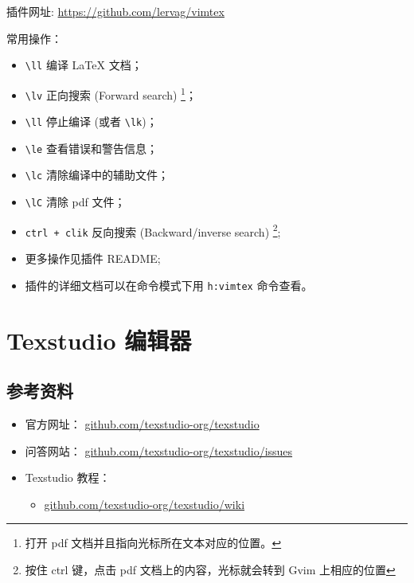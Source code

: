 \documentclass[
    11pt,
    cite=authoryear,
    device=normal,
    lang=cn,
    mode=simple,
    result=answer,
    toc=onecol,
]{elegantbook_sierxue}
\begin{document}
插件网址:
\href{https://github.com/lervag/vimtex}{https://github.com/lervag/vimtex}

常用操作：
\begin{itemize}
    \item \lstinline{\ll} 编译 \LaTeX{} 文档；
    \item \lstinline{\lv} 正向搜索 (Forward search)
        \footnote{打开 pdf 文档并且指向光标所在文本对应的位置。}；
    \item \lstinline{\ll} 停止编译 (或者 \lstinline{\lk})；
    \item \lstinline{\le} 查看错误和警告信息；
    \item \lstinline{\lc} 清除编译中的辅助文件；
    \item \lstinline{\lC} 清除 pdf 文件；
    \item \lstinline{ctrl + clik} 反向搜索 (Backward/inverse search)
        \footnote{按住 ctrl 键，点击 pdf 文档上的内容，光标就会转到 Gvim
        上相应的位置};
    \item 更多操作见插件 README;
    \item 插件的详细文档可以在命令模式下用 \lstinline{h:vimtex} 命令查看。
\end{itemize}

\section{Texstudio 编辑器}%
\label{sec:texstudio}

\subsection{参考资料}%
\label{sub:texstudio-refs}

\begin{itemize}
    \item 官方网址： \href{https://github.com/texstudio-org/texstudio}
        {github.com/texstudio-org/texstudio}
    \item 问答网站：
        \href{https://github.com/texstudio-org/texstudio/issues}
        {github.com/texstudio-org/texstudio/issues}
    \item Texstudio 教程：
        \begin{itemize}
            \item \href{https://github.com/texstudio-org/texstudio/wiki}
                {github.com/texstudio-org/texstudio/wiki}
        \end{itemize}
\end{itemize}
\end{document}
